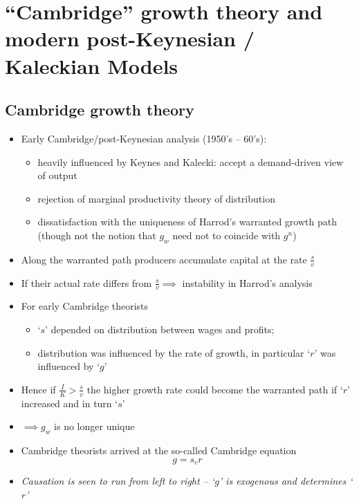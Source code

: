 \documentclass[a4paper,twoside]{article}
\numberwithin{equation}{section}
\numberwithin{figure}{section}
\begin{document}
\section{``Cambridge'' growth theory and modern post-Keynesian / Kaleckian Models}
\subsection{Cambridge growth theory}
	\begin{itemize}
		\item Early Cambridge/post-Keynesian analysis (1950's -- 60's):
		\begin{itemize}
			\item heavily influenced by Keynes and Kalecki: accept a demand-driven view of output
			\item rejection of marginal productivity theory of distribution
			\item dissatisfaction with the uniqueness of Harrod's warranted growth path (though not the notion that \( g_w \) need not to coincide with \( g^n \))
		\end{itemize}
	   \item Along the warranted path producers accumulate capital at the rate \( \frac{s}{v} \)
	   \item If their actual rate differs from \( \frac{s}{v} \implies \) instability in Harrod's analysis
	   \item For early Cambridge theorists 
	   \begin{itemize}
		\item `\( s \)' depended on distribution between wages and profits; 
		\item distribution was influenced by the rate of growth, in particular `\( r \)' was influenced by `\( g \)'
	   \end{itemize}
	   \item Hence if \( \frac{I}{K} > \frac{s}{v} \) the higher growth rate could become the warranted path if `\( r \)' increased and in turn `\( s \)'
	   \item \( \implies g_w \) is no longer unique
	   \item  Cambridge theorists arrived at the so-called Cambridge equation
	   \begin{equation}
			g = s_c r \label{eq:7.1}
	   \end{equation}
	   \item \textit{Causation is seen to run from left to right -- `\( g \)' is exogenous and determines `\( r \)'} 
	\end{itemize}
\end{document}
